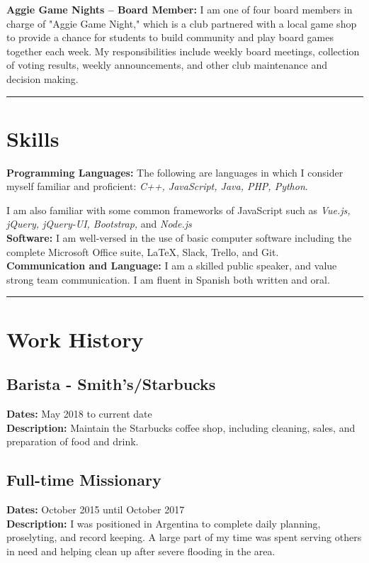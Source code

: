\documentclass[letterpaper]{article}
\begin{document}
\noindent\textbf{Aggie Game Nights -- Board Member: } I am one of four board members in charge of "Aggie Game Night," which is a club partnered with a local game shop to provide a chance for students to build community and play board games together each week. My responsibilities include weekly board meetings, collection of voting results, weekly announcements, and other club maintenance and decision making. 

\noindent\rule{2in}{0.4pt}


\section{Skills}

\textbf{Programming Languages: } The following are languages in which I consider myself familiar and proficient: \textit{C++, JavaScript, Java, PHP, Python}. 

I am also familiar with some common frameworks of JavaScript such as \textit{Vue.js, jQuery, jQuery-UI, Bootstrap,} and \textit{Node.js}\\

\noindent\textbf{Software: } I am well-versed in the use of basic computer software including the complete Microsoft Office suite, \LaTeX, Slack, Trello, and Git.\\

\noindent\textbf{Communication and Language: } I am a skilled public speaker, and value strong team communication. I am fluent in Spanish both written and oral.

\noindent\rule{2in}{0.4pt}


\section{Work History}
\subsection{Barista - Smith's/Starbucks}
\textbf{Dates: } May 2018 to current date\\
\textbf{Description: } Maintain the Starbucks coffee shop, including cleaning, sales, and preparation of food and drink.

\subsection{Full-time Missionary}
\textbf{Dates: } October 2015 until October 2017\\
\textbf{Description: } I was positioned in Argentina to complete daily planning, proselyting, and record keeping. A large part of my time was spent serving others in need and helping clean up after severe flooding in the area.
\end{document}
